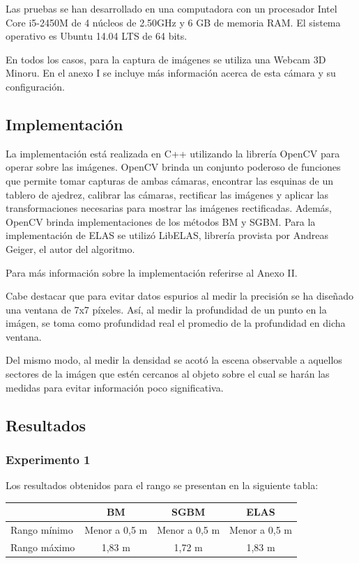 \documentclass[11pt,a4paper,titlepage]{article}
\begin{document}
Las pruebas se han desarrollado en una computadora con un procesador Intel Core i5-2450M de 4 núcleos de 2.50GHz y 6 GB de memoria RAM. El sistema operativo es Ubuntu 14.04 LTS de 64 bits.

En todos los casos, para la captura de imágenes se utiliza una Webcam 3D Minoru. En el anexo I se incluye más información acerca de esta cámara y su configuración.

\subsection{Implementación}

La implementación está realizada en C++ utilizando la librería OpenCV para operar sobre las imágenes. OpenCV brinda un conjunto poderoso de funciones que permite tomar capturas de ambas cámaras, encontrar las esquinas de un tablero de ajedrez, calibrar las cámaras, rectificar las imágenes y aplicar las transformaciones necesarias para mostrar las imágenes rectificadas. Además, OpenCV brinda implementaciones de los métodos BM y SGBM. Para la implementación de ELAS se utilizó LibELAS, librería provista por Andreas Geiger, el autor del algoritmo.

Para más información sobre la implementación referirse al Anexo II.

Cabe destacar que para evitar datos espurios al medir la precisión se ha diseñado una ventana de 7x7 píxeles. Así, al medir la profundidad de un punto en la imágen, se toma como profundidad real el promedio de la profundidad en dicha ventana.

Del mismo modo, al medir la densidad se acotó la escena observable a aquellos sectores de la imágen que estén cercanos al objeto sobre el cual se harán las medidas para evitar información poco significativa.

\subsection{Resultados}

\subsubsection{Experimento 1}

Los resultados obtenidos para el rango se presentan en la siguiente tabla:

\begin{tabular}{ | l | c | c | c | }
	\hline  
	& BM & SGBM & ELAS \\
	\hline  
	Rango mínimo & Menor a 0,5 m & Menor a 0,5 m & Menor a 0,5 m \\
	\hline  
	Rango máximo & 1,83 m & 1,72 m & 1,83 m \\
	\hline  
\end{tabular}
\end{document}

